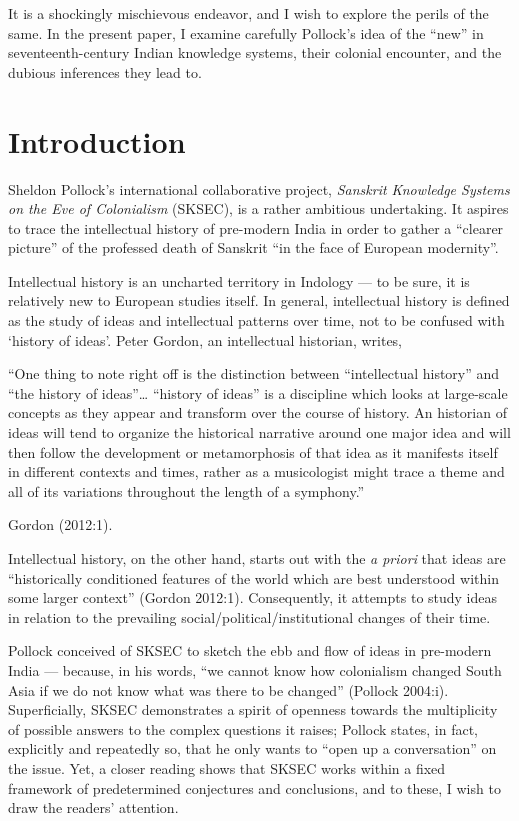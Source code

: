 It is a shockingly mischievous endeavor, and I wish to explore the perils of the same.  In the present paper, I examine carefully Pollock’s idea of the “new” in seventeenth-century Indian knowledge systems, their colonial encounter, and the dubious inferences they lead to.\\[-20pt]

\section*{Introduction}

Sheldon Pollock’s international collaborative project, {\sl Sanskrit Knowledge Systems on the Eve of Colonialism} (SKSEC), is a rather ambitious undertaking. It aspires to trace the intellectual history of pre-modern India in order to gather a “clearer picture” of the professed death of Sanskrit “in the face of European modernity”. 

Intellectual history is an uncharted territory in Indology — to be sure, it is relatively new to European studies itself. In general, intellectual history is defined as the study of ideas and intellectual patterns over time, not to be confused with ‘history of ideas’. Peter Gordon, an intellectual historian, writes, 
\begin{myquote}
“One thing to note right off is the distinction between “intellectual history” and “the history of ideas”… “history of ideas” is a discipline which looks at large-scale concepts as they appear and transform over the course of history. An historian of ideas will tend to organize the historical narrative around one major idea and will then follow the development or metamorphosis of that idea as it manifests itself in different contexts and times, rather as a musicologist might trace a theme and all of its variations throughout the length of a symphony.” 

\hfill{Gordon (2012:1).}
\end{myquote}

Intellectual history, on the other hand, starts out with the  {\sl a priori} that ideas are “historically conditioned features of the world which are best understood within some larger context”  (Gordon 2012:1). Consequently, it attempts to study ideas in relation to the prevailing social/political/institutional changes of their time. 

Pollock conceived of SKSEC to sketch the ebb and flow of ideas in pre-modern India — because, in his words, “we cannot know how colonialism changed South Asia if we do not know what was there to be changed” (Pollock 2004:i). Superficially, SKSEC demonstrates a spirit of openness towards the multiplicity of possible answers to the complex questions it raises; Pollock states, in fact, explicitly and repeatedly so, that he only wants to “open up a conversation” on the issue. Yet, a closer reading shows that SKSEC works within a fixed framework of predetermined conjectures and conclusions, and to these, I wish to draw the readers’ attention. 

